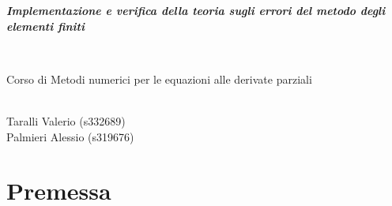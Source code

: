 \documentclass[11pt]{beamer}
\title{
    \texorpdfstring{
    \parbox{1.5\textwidth}{
    \LARGE\emph{\textbf{Implementazione e verifica della teoria\texorpdfstring{\\}{} sugli errori del metodo degli elementi finiti}}
    }
    }{}
    \texorpdfstring{\\\vspace{10pt}}{}
    \texorpdfstring{\parbox{.5\textwidth}{\centering\large Corso di Metodi numerici per le equazioni alle derivate parziali}}{}
}
\author{Taralli Valerio (s332689)\texorpdfstring{\\}{} Palmieri Alessio (s319676)\texorpdfstring{\\}{}}
\date{}%
\begin{document}
    \newcommand{\titoloSez}{Temporaneo}

    
    \begin{frame}
        \begin{center}
            \textcolor{violaSez}{
                \LARGE
                \parbox{\textwidth}{\centering%
                    \emph{\textbf{Implementazione e verifica della teoria sugli errori del metodo degli elementi finiti}}
                }
            }
            \\\vspace{0.4cm}
            \textcolor{violaSez}{
                \parbox{.5\textwidth}{\centering%
                    \large Corso di Metodi numerici per le equazioni alle derivate parziali
                }
            }
            \\\vspace{1cm}
            Taralli Valerio (s332689)\\
            Palmieri Alessio (s319676)
        \end{center}
    \end{frame}
    

    \section*{Premessa}
        
\end{document}
